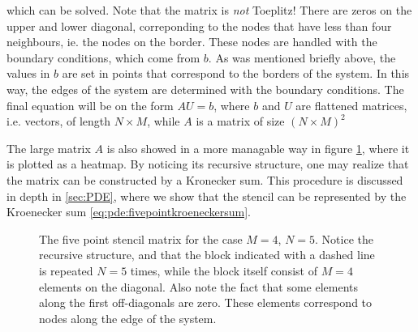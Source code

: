 which can be solved.
Note that the matrix is \emph{not} Toeplitz!
There are zeros on the upper and lower diagonal, correponding to the nodes that have less than four neighbours, ie. the nodes on the border.
These nodes are handled with the boundary conditions, which come from $b$. 
As was mentioned briefly above, the values in $b$ are set in points that correspond to the borders of the system.
In this way, the edges of the system are determined with the boundary conditions.
The final equation will be on the form $AU = b$, where $b$ and $U$ are flattened matrices, i.e. vectors, of length $N \times M$, while $A$ is a matrix of size $(N \times M)^2$

The large matrix $A$ is also showed in a more managable way in figure \ref{fig:laplace:stencil}, where it is plotted as a heatmap.
By noticing its recursive structure, one may realize that the matrix can be constructed by a Kronecker sum.
This procedure is discussed in depth in \cref{sec:PDE}, where we show that the stencil can be represented by the Kroenecker sum \ref{eq:pde:fivepointkroeneckersum}.

\begin{figure}[btp]
  \centering

  \caption{The five point stencil matrix for the case $M=4$, $N=5$. Notice the recursive structure, and that the block indicated with a dashed line is repeated $N=5$ times, while the block itself consist of $M=4$ elements on the diagonal.
    Also note the fact that some elements along the first off-diagonals are zero.
  These elements correspond to nodes along the edge of the system.}
  \label{fig:laplace:stencil}
\end{figure}

